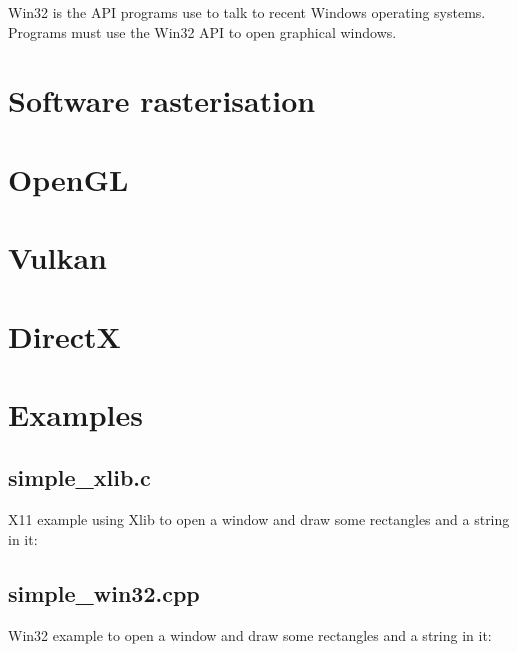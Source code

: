 \documentclass{article}
\begin{document}
Win32 is the API programs use to talk to recent Windows operating systems.
Programs must use the Win32 API to open graphical windows.


\section{Software rasterisation}
\label{sec:software-rasterisation}


\section{OpenGL}
\label{sec:opengl}


\section{Vulkan}
\label{sec:vulkan}


\section{DirectX}
\label{sec:directx}


\section{Examples}
\label{sec:examples}

\subsection{simple\_xlib.c}
\label{subsec:simple_xlib.c}

X11 example using Xlib to open a window and draw some rectangles and a string
in it:



\subsection{simple\_win32.cpp}
\label{subsec:simple_win32.cpp}

Win32 example to open a window and draw some rectangles and a string in it:


\end{document}
